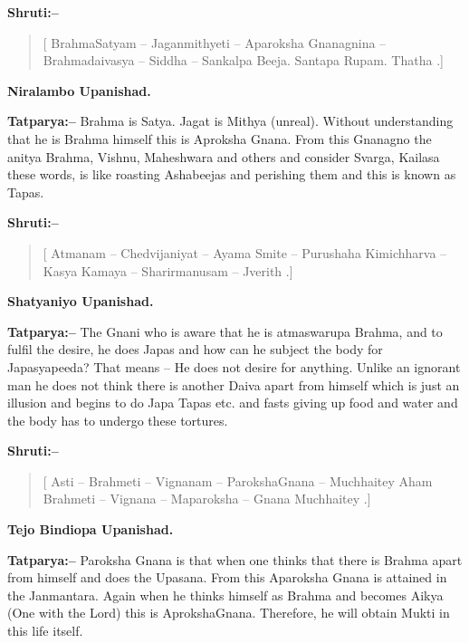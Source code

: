 \textbf{Shruti:–}

\begin{verse}
[ BrahmaSatyam – Jaganmithyeti – Aparoksha Gnanagnina – Brahmadaivasya – Siddha – Sankalpa Beeja. Santapa Rupam. Thatha .]
\end{verse}

\begin{flushright}
\textbf{Niralambo Upanishad.}
\end{flushright}

\textbf{Tatparya:–} Brahma is Satya. Jagat is Mithya (unreal). Without understanding that he is Brahma himself this is Aproksha Gnana. From this Gnanagno the anitya Brahma, Vishnu, Maheshwara and others and consider Svarga, Kailasa these words, is like roasting Ashabeejas and perishing them and this is known as Tapas.

\textbf{Shruti:–}

\begin{verse}
[ Atmanam – Chedvijaniyat – Ayama Smite – Purushaha  Kimichharva – Kasya Kamaya – Sharirmanusam – Jverith .]
\end{verse}

\begin{flushright}
\textbf{Shatyaniyo Upanishad.}
\end{flushright}

\textbf{Tatparya:–} The Gnani who is aware that he is atmaswarupa Brahma, and to fulfil the desire, he does Japas and how can he subject the body for Japasyapeeda? That means – He does not desire for anything. Unlike an ignorant man he does not think there is another Daiva apart from himself which is just an illusion and begins to do Japa Tapas etc. and fasts giving up food and water and the body has to undergo these tortures.

\textbf{Shruti:–}

\begin{verse}
[ Asti – Brahmeti – Vignanam – ParokshaGnana – Muchhaitey  Aham Brahmeti – Vignana – Maparoksha – Gnana Muchhaitey .]
\end{verse}

\begin{flushright}
\textbf{Tejo Bindiopa Upanishad.}
\end{flushright}

\textbf{Tatparya:–} Paroksha Gnana is that when one thinks that there is Brahma apart from himself and does the Upasana. From this Aparoksha Gnana is attained in the Janmantara. Again when he thinks himself as Brahma and becomes Aikya (One with the Lord) this is AprokshaGnana. Therefore, he will obtain Mukti in this life itself.

